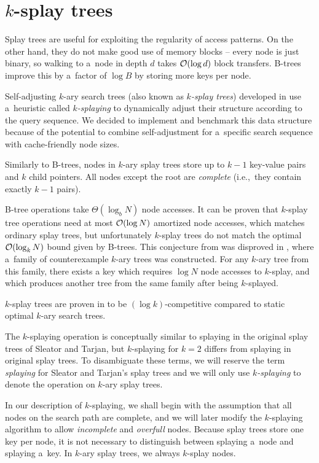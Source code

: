 \chapter{$k$-splay trees}
\label{chapter:ksplay}
Splay trees are useful for exploiting the regularity of access patterns.
On the other hand, they do not make good use of memory blocks -- every node
is just binary, so walking to a~node in depth $d$ takes $\mathcal{O}(\log d)$ block
transfers. B-trees improve this by a~factor of $\log B$ by storing more keys
per node.

Self-adjusting $k$-ary search trees (also known as \emph{$k$-splay trees})
developed in \cite{ksplay-sherk} use a~heuristic called \emph{$k$-splaying}
to dynamically adjust their structure according to the query sequence.
We decided to implement and benchmark this data structure because of
the potential to combine self-adjustment for a~specific search sequence with
cache-friendly node sizes.

Similarly to B-trees, nodes in $k$-ary splay trees store up to $k-1$ key-value
pairs and $k$ child pointers. All nodes except the root are \emph{complete}
(i.e.,\ they contain exactly $k-1$ pairs).

\mbox{B-tree} operations take $\Theta(\log_b N)$ node accesses. It can be
proven that \mbox{$k$-splay} tree operations need at most $\mathcal{O}(\log N)$
amortized node accesses, which matches ordinary splay trees, but unfortunately
$k$-splay trees do not match the optimal $\mathcal{O}(\log_k N)$ bound given by B-trees.
This conjecture from \cite{ksplay-sherk} was disproved in \cite{ksplay-nonopt},
where a~family of counterexample $k$-ary trees was constructed. For any
\mbox{$k$-ary} tree from this family, there exists a key which requires
$\log N$ node accesses to $k$-splay, and which produces another tree from
the same family after being $k$-splayed.

$k$-splay trees are proven in \cite{ksplay-sherk} to be $(\log k)$-competitive
compared to static optimal $k$-ary search trees.

The $k$-splaying operation is conceptually similar to splaying in the original
splay trees of Sleator and Tarjan, but $k$-splaying for $k=2$ differs from
splaying in original splay trees. To disambiguate these terms, we will
reserve the term \emph{splaying} for Sleator and Tarjan's splay trees and
we will only use \emph{$k$-splaying} to denote the operation
on $k$-ary splay trees.

In our description of $k$-splaying, we shall begin with the assumption that
all nodes on the search path are complete, and we will later modify
the $k$-splaying algorithm to allow \emph{incomplete} and \emph{overfull}
nodes.
Because splay trees store one key per node, it is not necessary to distinguish
between splaying a~node and splaying a~key. In $k$-ary splay trees, we always
$k$-splay nodes.

